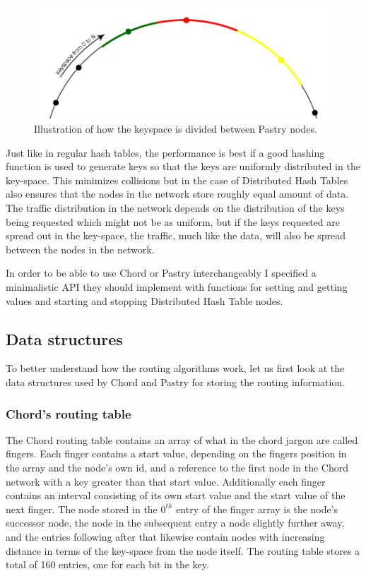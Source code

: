 \begin{figure}[!htb]
\begin{center}
	\includegraphics[width=0.9\linewidth]{illustrations/PastryKeySpace.png}
  \caption{Illustration of how the keyspace is divided between Pastry nodes.}
  \label{figKeyspacePastry}
\end{center}
\end{figure}

Just like in regular hash tables, the performance is best if a good hashing function is used to generate keys so that the keys are uniformly distributed in the key-space. This minimizes collisions but in the case of Distributed Hash Tables also ensures that the nodes in the network store roughly equal amount of data. The traffic distribution in the network depends on the distribution of the keys being requested which might not be as uniform, but if the keys requested are spread out in the key-space, the traffic, much like the data, will also be spread between the nodes in the network.

In order to be able to use Chord or Pastry interchangeably I specified a minimalistic API they should implement with functions for setting and getting values and starting and stopping Distributed Hash Table nodes.

\subsection{Data structures}
To better understand how the routing algorithms work, let us first look at the data structures used by Chord and Pastry for storing the routing information.

\subsubsection{Chord's routing table}
The Chord routing table contains an array of what in the chord jargon are called fingers.
Each finger contains a start value, depending on the fingers position in the array and the node's own id, and a reference to the first node in the Chord network with a key greater than that start value.
Additionally each finger contains an interval consisting of its own start value and the start value of the next finger.
The node stored in the $ 0^{th} $ entry of the finger array is the node's successor node, the node in the subsequent entry a node slightly further away, and the entries following after that likewise contain nodes with increasing distance in terms of the key-space from the node itself. 
The routing table stores a total of 160 entries, one for each bit in the key.

